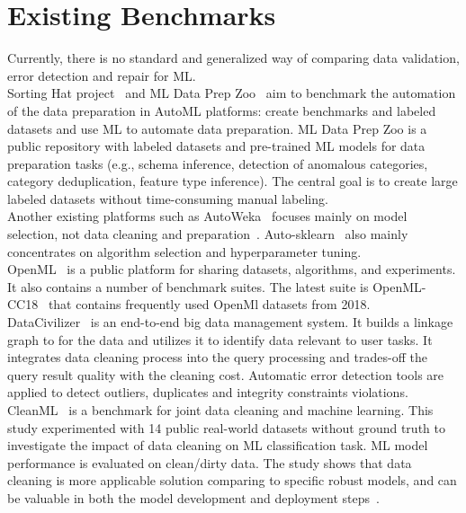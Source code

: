 \section{Existing Benchmarks}

Currently, there is no standard and generalized way of comparing data validation, error detection and repair for ML.\\
Sorting Hat project~\cite{sortinghat} and ML Data Prep Zoo~\cite{prepzoo} aim to benchmark the automation of the data preparation in AutoML platforms: create benchmarks and labeled datasets and use ML to automate data preparation.
ML Data Prep Zoo is a public repository with labeled datasets and pre-trained ML models for data preparation tasks (e.g., schema inference, detection of anomalous categories, category deduplication, feature type inference).
The central goal is to create large labeled datasets without time-consuming manual labeling.\\
Another existing platforms such as AutoWeka~\cite{autoweka} focuses mainly on model selection, not data cleaning and preparation~\cite{prepzoo}. 
Auto-sklearn~\cite{autosklearn} also mainly concentrates on algorithm selection and hyperparameter tuning.
\\
OpenML~\cite{openml_suites} is a public platform for sharing datasets, algorithms, and experiments. It also contains a number of benchmark suites. The latest suite is OpenML-CC18~\cite{openml_suites} that contains frequently used OpenMl datasets from 2018.
\\
DataCivilizer~\cite{datacivil} is an end-to-end big data management system. 
It builds a linkage graph to for the data and utilizes it to identify data relevant to user tasks. 
It integrates data cleaning process into the query processing and trades-off the query result quality with the cleaning cost. 
Automatic error detection tools are applied to detect outliers, duplicates and integrity constraints violations.
\\
CleanML~\cite{cleanml} is a benchmark for joint data cleaning and machine learning. This study experimented with 14 public real-world datasets without ground truth to investigate the impact of data cleaning on ML classification task. 
ML model performance is evaluated on clean/dirty data. The study shows that data cleaning is more applicable solution comparing to specific robust models, and can be valuable in both the model development and deployment steps~\cite{cleanml}.
